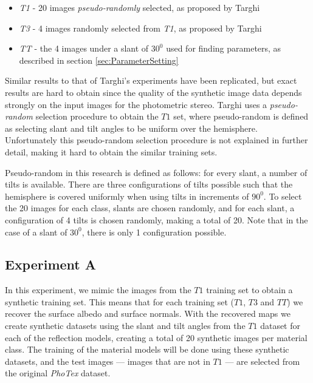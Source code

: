 \begin{itemize}
	\item{\textit{T1} - 20 images {\it pseudo-randomly} selected, as proposed by Targhi}
	\item{\textit{T3} - 4 images randomly selected from \textit{T1}, as proposed by Targhi}
	\item{\textit{TT} - the 4 images under a slant of $30^0$ used for finding parameters, as described in section \ref{sec:ParameterSetting}}
\end{itemize}

Similar results to that of Targhi's experiments have been replicated, but exact results are hard to obtain since the quality of the synthetic image data depends strongly on the input images for the photometric stereo. Targhi uses a {\it pseudo-random} selection procedure to obtain the $T1$ set, where pseudo-random is defined as selecting slant and tilt angles to be uniform over the hemisphere. Unfortunately this pseudo-random selection procedure is not explained in further detail, making it hard to obtain the similar training sets.

Pseudo-random in this research is defined as follows: for every slant, a number of tilts is available. There are three configurations of tilts possible such that the hemisphere is covered uniformly when using tilts in increments of $90^0$. To select the 20 images for each class, slants are chosen randomly, and for each slant, a configuration of 4 tilts is chosen randomly, making a total of 20. Note that in the case of a slant of $30^0$, there is only 1 configuration possible. 

\subsection{Experiment A}
In this experiment, we mimic the images from the $T1$ training set to obtain a synthetic training set. This means that for each training set ($T1$, $T3$ and $TT$) we recover the surface albedo and surface normals. With the recovered maps we create synthetic datasets using the slant and tilt angles from the $T1$ dataset for each of the reflection models, creating a total of 20 synthetic images per material class. The training of the material models will be done using these synthetic datasets, and the test images --- images that are not in $T1$ --- are selected from the original {\it PhoTex} dataset.

